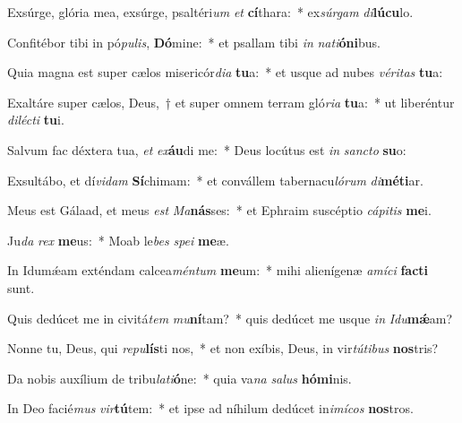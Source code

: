 \item Exsúrge, glória mea, exsúrge, psaltéri\textit{um} \textit{et} \textbf{cí}thara:~* ex\textit{súr}\textit{gam} \textit{di}\textbf{lú}\textbf{cu}lo.
\item Confitébor tibi in pó\textit{pu}\textit{lis}, \textbf{Dó}mine:~* et psallam tibi \textit{in} \textit{na}\textit{ti}\textbf{ó}\textbf{ni}bus.
\item Quia magna est super cælos misericór\textit{di}\textit{a} \textbf{tu}a:~* et usque ad nubes \textit{vé}\textit{ri}\textit{tas} \textbf{tu}a:
\item Exaltáre super cælos, Deus,~† et super omnem terram gló\textit{ri}\textit{a} \textbf{tu}a:~* ut liberéntur \textit{di}\textit{léc}\textit{ti} \textbf{tu}i.
\item Salvum fac déxtera tua, \textit{et} \textit{ex}\textbf{áu}di me:~* Deus locútus est \textit{in} \textit{sanc}\textit{to} \textbf{su}o:
\item Exsultábo, et dí\textit{vi}\textit{dam} \textbf{Sí}chimam:~* et convállem tabernacu\textit{ló}\textit{rum} \textit{di}\textbf{mé}\textbf{ti}ar.
\item Meus est Gálaad, et meus \textit{est} \textit{Ma}\textbf{nás}ses:~* et Ephraim suscéptio \textit{cá}\textit{pi}\textit{tis} \textbf{me}i.
\item Ju\textit{da} \textit{rex} \textbf{me}us:~* Moab le\textit{bes} \textit{spe}\textit{i} \textbf{me}æ.
\item In Idumǽam exténdam calcea\textit{mén}\textit{tum} \textbf{me}um:~* mihi alienígenæ \textit{a}\textit{mí}\textit{ci} \textbf{fac}\textbf{ti} sunt.
\item Quis dedúcet me in civitá\textit{tem} \textit{mu}\textbf{ní}tam?~* quis dedúcet me usque \textit{in} \textit{I}\textit{du}\textbf{mǽ}am?
\item Nonne tu, Deus, qui \textit{re}\textit{pu}\textbf{lís}ti nos,~* et non exíbis, Deus, in vir\textit{tú}\textit{ti}\textit{bus} \textbf{nos}tris?
\item Da nobis auxílium de tribu\textit{la}\textit{ti}\textbf{ó}ne:~* quia va\textit{na} \textit{sa}\textit{lus} \textbf{hó}\textbf{mi}nis.
\item In Deo facié\textit{mus} \textit{vir}\textbf{tú}tem:~* et ipse ad níhilum dedúcet in\textit{i}\textit{mí}\textit{cos} \textbf{nos}tros.

